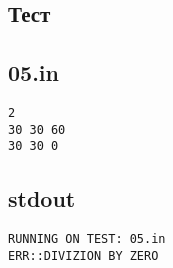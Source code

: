\documentclass[a4paper,11pt]{article}
\begin{document}
\begin{footnotesize}
\section{Тест}
\subsection*{05.in}
\begin{lstlisting}
2
30 30 60
30 30 0
\end{lstlisting}

\subsection*{stdout}
\begin{lstlisting}
RUNNING ON TEST: 05.in
ERR::DIVIZION BY ZERO
\end{lstlisting}
\end{footnotesize}
\end{document}
